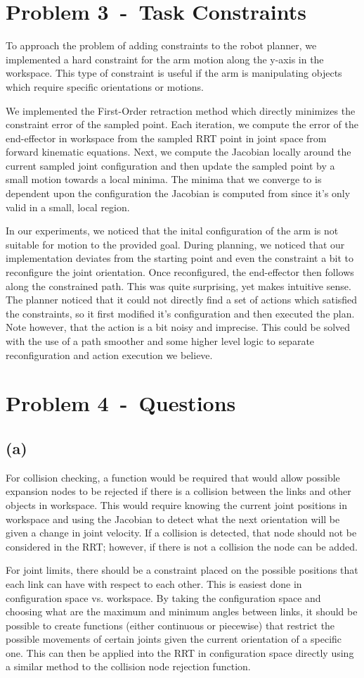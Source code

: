 \documentclass[12pt]{article}
\newcommand{\problem}[2]{\section*{Problem {#1}~-~{#2}}}
\newcommand{\problemPart}[1]{\subsection*{(#1)}}
\begin{document}
\problem{3}{Task Constraints}
\label{sec:problem_3}
To approach the problem of adding constraints to the robot planner, we implemented a hard constraint for the arm motion along the y-axis in the workspace. This type of constraint is useful if the arm is manipulating objects which require specific orientations or motions.

We implemented the First-Order retraction method which directly minimizes the constraint error of the sampled point. Each iteration, we compute the error of the end-effector in workspace from the sampled RRT point in joint space from forward kinematic equations. Next, we compute the Jacobian locally around the current sampled joint configuration and then update the sampled point by a small motion towards a local minima. The minima that we converge to is dependent upon the configuration the Jacobian is computed from since it's only valid in a small, local region.

In our experiments, we noticed that the inital configuration of the arm is not suitable for motion to the provided goal. During planning, we noticed that our implementation deviates from the starting point and even the constraint a bit to reconfigure the joint orientation. Once reconfigured, the end-effector then follows along the constrained path. This was quite surprising, yet makes intuitive sense. The planner noticed that it could not directly find a set of actions which satisfied the constraints, so it first modified it's configuration and then executed the plan. Note however, that the action is a bit noisy and imprecise. This could be solved with the use of a path smoother and some higher level logic to separate reconfiguration and action execution we believe.

\problem{4}{Questions}
\label{sec:problem_4}
\problemPart{a}
For collision checking, a function would be required that would allow possible expansion nodes to be rejected if there is a collision between the links and other objects in workspace. This would require knowing the current joint positions in workspace and using the Jacobian to detect what the next orientation will be given a change in joint velocity. If a collision is detected, that node should not be considered in the RRT; however, if there is not a collision the node can be added.

For joint limits, there should be a constraint placed on the possible positions that each link can have with respect to each other. This is easiest done in configuration space vs. workspace. By taking the configuration space and choosing what are the maximum and minimum angles between links, it should be possible to create functions (either continuous or piecewise) that restrict the possible movements of certain joints given the current orientation of a specific one. This can then be applied into the RRT in configuration space directly using a similar method to the collision node rejection function.
\end{document}
